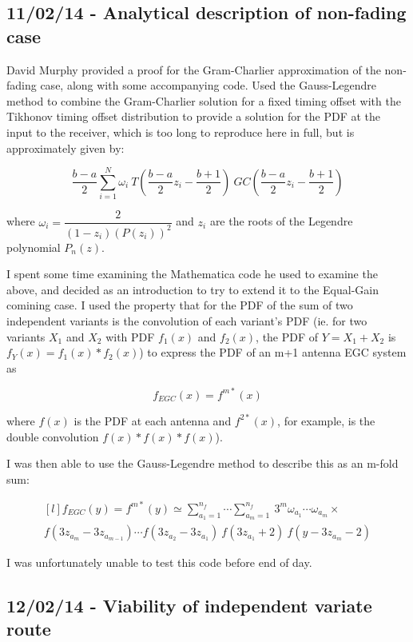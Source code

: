 \subsection{11/02/14 - Analytical description of non-fading case}

David Murphy provided a proof for the Gram-Charlier approximation of the
non-fading case, along with some accompanying code. Used the
Gauss-Legendre method to combine the Gram-Charlier solution for a fixed
timing offset with the Tikhonov timing offset distribution to provide a
solution for the PDF at the input to the receiver, which is too long to
reproduce here in full, but is approximately given by:

\[
\dfrac{b-a}{2} \sum\limits_{i=1}^N \omega_i \: T \left (\dfrac{b-a}{2} z_i - \dfrac{b+1}{2} \right ) \: GC \left (\dfrac{b-a}{2} z_i - \dfrac{b+1}{2} \right )
\]

where $\omega_i = \dfrac{2}{(1-z_i)(P(z_i))^2}$ and $z_i$ are the roots
of the Legendre polynomial $P_n(z)$.

I spent some time examining the Mathematica code he used to examine the
above, and decided as an introduction to try to extend it to the
Equal-Gain comining case. I used the property that for the PDF of the
sum of two independent variants is the convolution of each variant's PDF
(ie. for two variants $X_1$ and $X_2$ with PDF $f_1(x)$ and $f_2(x)$,
the PDF of $Y=X_1+X_2$ is $f_Y(x) = f_1(x) \ast f_2(x)$) to express the
PDF of an m+1 antenna EGC system as

\[
f_{EGC}(x) = f^{m \ast}(x)
\]

where $f(x)$ is the PDF at each antenna and $f^{2 \ast}(x)$, for
example, is the double convolution $f(x) \ast f(x) \ast f(x)$).

I was then able to use the Gauss-Legendre method to describe this as an
m-fold sum:

\[
\begin{matrix*}[l]
f_{EGC}(y) = f^{m \ast}(y) \simeq \sum\limits_{a_1=1}^{n_f} \cdots \sum\limits_{a_m=1}^{n_f} \: 3^m \omega_{a_1}  \cdots \omega_{a_m} \times \\
f(3 z_{a_m} - 3 z_{a_{m-1}}) \cdots f(3 z_{a_2} - 3 z_{a_1}) \: f(3 z_{a_1} + 2) \: f(y - 3 z_{a_m} - 2) 
\end{matrix*}
\]

I was unfortunately unable to test this code before end of day.

\subsection{12/02/14 - Viability of independent variate route}

